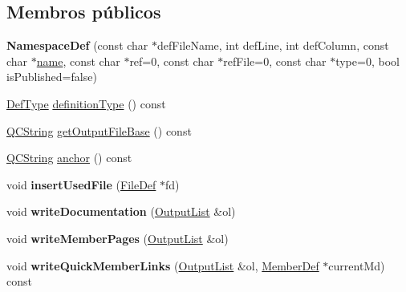 \subsection*{Membros públicos}
\begin{DoxyCompactItemize}
\item 
\hypertarget{class_namespace_def_ac4dacc4c21f76feab6e228823cd7c65e}{{\bfseries Namespace\-Def} (const char $\ast$def\-File\-Name, int def\-Line, int def\-Column, const char $\ast$\hyperlink{class_definition_a2c310e06c9aadc6fb218f80fcbb5c695}{name}, const char $\ast$ref=0, const char $\ast$ref\-File=0, const char $\ast$type=0, bool is\-Published=false)}\label{class_namespace_def_ac4dacc4c21f76feab6e228823cd7c65e}

\item 
\hyperlink{class_definition_intf_a2dc566dfec40397b2990e6520536ecb5}{Def\-Type} \hyperlink{class_namespace_def_aac410235a8bf90e471e649bd9dbf9c5e}{definition\-Type} () const 
\item 
\hyperlink{class_q_c_string}{Q\-C\-String} \hyperlink{class_namespace_def_af72a982ba8198cd5c98e9fc850b71df6}{get\-Output\-File\-Base} () const 
\item 
\hyperlink{class_q_c_string}{Q\-C\-String} \hyperlink{class_namespace_def_acd17ae1d9600f864b1beb85dfb99a4f4}{anchor} () const 
\item 
\hypertarget{class_namespace_def_a88e8b08885f0858e7f795eb689c10d8b}{void {\bfseries insert\-Used\-File} (\hyperlink{class_file_def}{File\-Def} $\ast$fd)}\label{class_namespace_def_a88e8b08885f0858e7f795eb689c10d8b}

\item 
\hypertarget{class_namespace_def_a0c85f3695c99f7b1aeb762bbdabc8d62}{void {\bfseries write\-Documentation} (\hyperlink{class_output_list}{Output\-List} \&ol)}\label{class_namespace_def_a0c85f3695c99f7b1aeb762bbdabc8d62}

\item 
\hypertarget{class_namespace_def_a3ab9294ac3e907a42b200665010f9381}{void {\bfseries write\-Member\-Pages} (\hyperlink{class_output_list}{Output\-List} \&ol)}\label{class_namespace_def_a3ab9294ac3e907a42b200665010f9381}

\item 
\hypertarget{class_namespace_def_a17f78962f99b43ea249eb44b0ae0a8d2}{void {\bfseries write\-Quick\-Member\-Links} (\hyperlink{class_output_list}{Output\-List} \&ol, \hyperlink{class_member_def}{Member\-Def} $\ast$current\-Md) const }\label{class_namespace_def_a17f78962f99b43ea249eb44b0ae0a8d2}


\end{DoxyCompactItemize}
